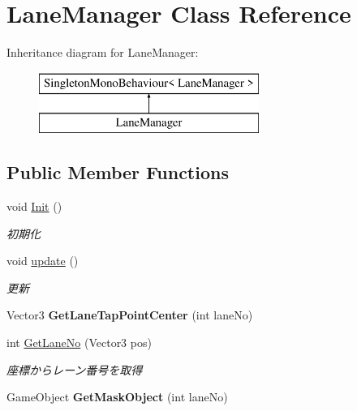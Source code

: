 \hypertarget{class_lane_manager}{}\section{Lane\+Manager Class Reference}
\label{class_lane_manager}
Inheritance diagram for Lane\+Manager\+:\begin{figure}[H]
\begin{center}
\leavevmode
\includegraphics[height=2.000000cm]{class_lane_manager}
\end{center}
\end{figure}
\subsection*{Public Member Functions}
\begin{DoxyCompactItemize}
\item 
void \hyperlink{class_lane_manager_acc5a0b76fee2459a9c5af08554f8dfc4}{Init} ()
\begin{DoxyCompactList}\small\item\em 初期化 \end{DoxyCompactList}\item 
void \hyperlink{class_lane_manager_a7b5a2327aaf8750abc07ecddbeecd431}{update} ()
\begin{DoxyCompactList}\small\item\em 更新 \end{DoxyCompactList}\item 
Vector3 {\bfseries Get\+Lane\+Tap\+Point\+Center} (int lane\+No)\hypertarget{class_lane_manager_a10cd73d620e3892b9572575afaf88103}{}\label{class_lane_manager_a10cd73d620e3892b9572575afaf88103}

\item 
int \hyperlink{class_lane_manager_a7f183791322e811b1021b19f77c3d98b}{Get\+Lane\+No} (Vector3 pos)
\begin{DoxyCompactList}\small\item\em 座標からレーン番号を取得 \end{DoxyCompactList}\item 
Game\+Object {\bfseries Get\+Mask\+Object} (int lane\+No)\hypertarget{class_lane_manager_aa7c8fa846e3f027cd7d585a96746e3a3}{}\label{class_lane_manager_aa7c8fa846e3f027cd7d585a96746e3a3}

\end{DoxyCompactItemize}
